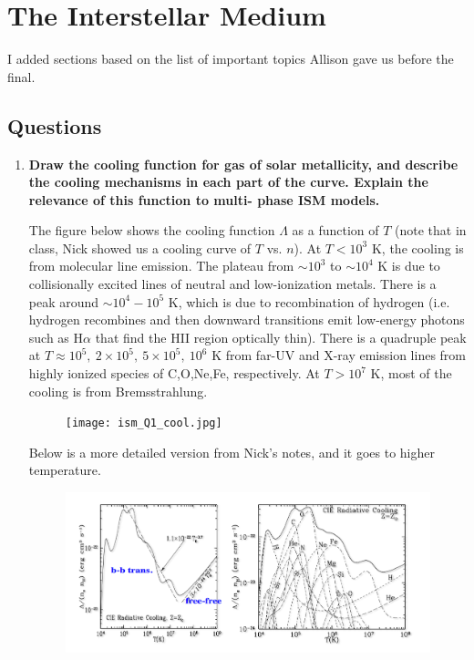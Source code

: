 \section{The Interstellar Medium}

I added sections based on the list of important topics Allison gave us 
before the final. 

\subsection{Questions}
\begin{enumerate}
\item \textbf{Draw the cooling function for gas of solar metallicity, and describe the cooling
      mechanisms in each part of the curve. Explain the relevance of this function to multi-
      phase ISM models.}
      
      The figure below shows the cooling function $\Lambda$ as a function of $T$ (note that in class, Nick showed us a cooling curve of $T$ vs. $n$). At $T < 10^3$ K, the cooling is from molecular line emission. The plateau from $\sim10^3$ to $\sim10^4$ K is due to collisionally excited lines of neutral and low-ionization metals. There is a peak around $\sim10^4-10^5$ K, which is due to recombination of hydrogen (i.e. hydrogen recombines and then downward transitions emit low-energy photons such as H$\alpha$ that find the HII region optically thin). There is a quadruple peak at $T \approx 10^5,~2\times 10^5,~5\times 10^5,~10^6$ K from far-UV and X-ray emission lines from highly ionized species of C,O,Ne,Fe, respectively. At $T > 10^7$ K, most of the cooling is from Bremsstrahlung.
      
            \begin{figure}[!h]
      \begin{center}
      \texttt{[image: ism\_Q1\_cool.jpg]}
      \end{center}
	\end{figure}
	
	Below is a more detailed version from Nick's notes, and it goes to higher temperature.
	
	  \begin{figure}[!h]
      \begin{center}
      \includegraphics[width=\textwidth]{ism_Q1_cool_b.jpg}
      \end{center}
	\end{figure}
      

\end{enumerate}
